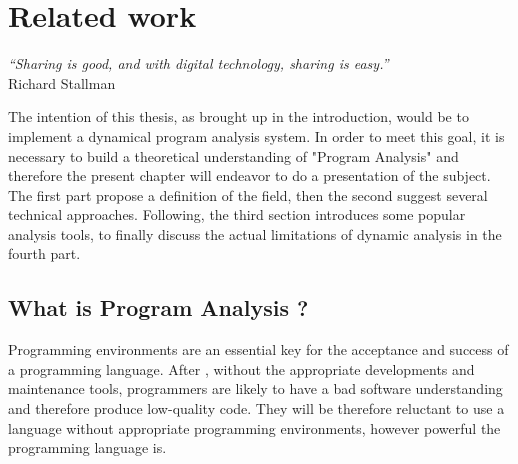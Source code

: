 
\chapter{Related work}
\label{chap:relatedwork}
\begin{flushright}
\textit{``Sharing is good, and with digital technology, sharing is easy.''} \\ Richard Stallman
\end{flushright}

The intention of this thesis, as brought up in the introduction, would be to implement a dynamical program analysis system. In order to meet this goal, it is necessary to build a theoretical understanding of "Program Analysis" and therefore the present chapter will endeavor to do a presentation of the subject. The first part propose a definition of the field, then the second suggest several technical approaches. Following, the third section introduces some popular analysis tools, to finally discuss the actual limitations of dynamic analysis in the fourth part.

\section{What is Program Analysis ?} 
Programming environments are an essential key for the acceptance and success of a programming language. After \cite{Ducasse1994}, without the appropriate developments and maintenance tools, programmers are likely to have a bad software understanding and therefore produce low-quality code. They will be therefore reluctant to use a language without appropriate programming environments, however powerful the programming language is.

